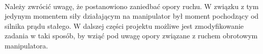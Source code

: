\paragraph*{}
Należy zwrócić uwagę, że postanowiono zaniedbać opory ruchu. W związku z tym jedynym momentem siły działającym na manipulator był moment pochodzący od silnika prądu stałego. W dalszej części projektu możliwe jest zmodyfikowanie zadania w taki sposób, by wziąć pod uwagę opory związane z ruchem obrotowym manipulatora.